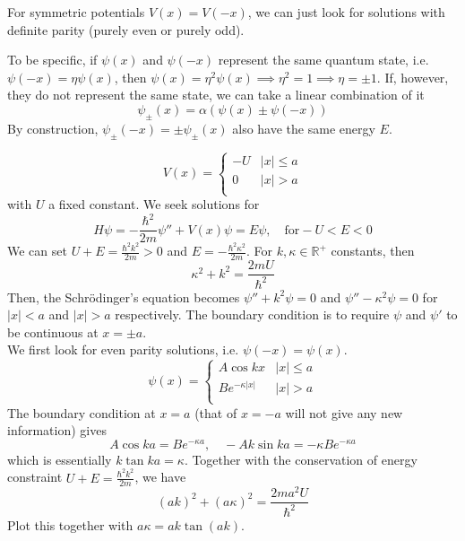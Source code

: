 \documentclass[a4paper]{article}
\begin{document}
\begin{prop}[Parity]
For symmetric potentials $V(x)=V(-x)$, we can just look for solutions with definite parity (purely even or purely odd).
\end{prop}
\begin{remarks}
To be specific, if $\psi(x)$ and $\psi(-x)$ represent the same quantum state, i.e. $\psi(-x)=\eta\psi(x)$, then $\psi(x)=\eta^2\psi(x)\implies\eta^2=1\implies\eta=\pm1$. If, however, they do not represent the same state, we can take a linear combination of it
$$\psi_\pm(x)=\alpha(\psi(x)\pm\psi(-x))$$
By construction, $\psi_\pm(-x)=\pm\psi_\pm(x)$ also have the same energy $E$.
\end{remarks}
\begin{eg}
   $$
V(x)=
\left\{
        \begin{array}{ll}
      -U & |x|\leq a \\
	0& |x|>a\\
        \end{array}
    \right.
$$
with $U$ a fixed constant. We seek solutions for
$$H\psi=-\frac{\hbar^2}{2m}\psi''+V(x)\psi=E\psi,\quad\text{for}-U<E<0$$
We can set $U+E=\frac{\hbar^2k^2}{2m}>0$ and $E=-\frac{\hbar^2\kappa^2}{2m}$. For $k,\kappa\in\mathbb{R}^+$ constants, then
$$\kappa^2+k^2=\frac{2mU}{\hbar^2}$$ 
Then, the Schr\"{o}dinger's equation becomes $\psi''+k^2\psi=0$ and $\psi''-\kappa^2\psi=0$ for $|x|<a$ and $|x|>a$ respectively. The boundary condition is to require $\psi$ and $\psi'$ to be continuous at $x=\pm a$.\\[5pt]
We first look for even parity solutions, i.e. $\psi(-x)=\psi(x)$.
   $$
\psi(x)=
\left\{
        \begin{array}{ll}
      A\cos kx & |x|\leq a \\
	Be^{-\kappa|x|}& |x|>a\\
        \end{array}
    \right.
$$
The boundary condition at $x=a$ (that of $x=-a$ will not give any new information) gives
$$A\cos ka=Be^{-\kappa a},\quad -Ak\sin ka=-\kappa Be^{-\kappa a}$$
which is essentially $k\tan ka=\kappa$. Together with the conservation of energy constraint $U+E=\frac{\hbar^2k^2}{2m}$, we have
$$(ak)^2+(a\kappa)^2=\frac{2ma^2U}{\hbar^2}$$
Plot this together with $a\kappa=ak\tan(ak)$.
\begin{center}
\end{center}
\end{eg}
\end{document}
